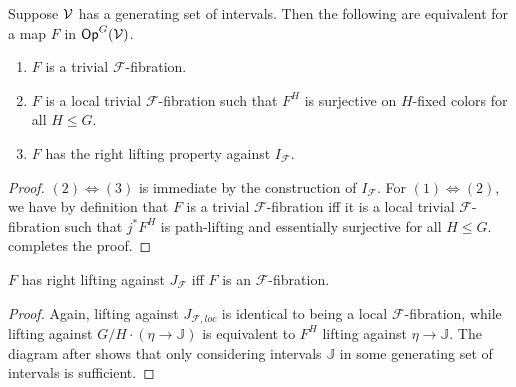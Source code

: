 \documentclass[a4paper,10pt
,draft
]{article}%
\renewcommand{\F}{\mathcal F}
\newcommand{\J}{\mathbb J}
\renewcommand{\1}{\eta}%
\begin{document}
\begin{lemma}
      \label{CAV_4.8}
      Suppose $\mathcal V$ has a generating set of intervals.
      Then the following are equivalent for a map $F$ in $\mathsf{Op}^G(\mathcal V)$.
      \begin{enumerate}[label = (\arabic*)]
      \item $F$ is a trivial $\F$-fibration.
      \item $F$ is a local trivial $\F$-fibration such that $F^H$ is surjective on $H$-fixed colors for all $H\leq G$.
      \item $F$ has the right lifting property against $I_{\F}$.
      \end{enumerate}
\end{lemma}
\begin{proof}
      $(2) \Leftrightarrow (3)$ is immediate by the construction of $I_{\F}$.
      For $(1) \Leftrightarrow (2)$, we have by definition that
      $F$ is a trivial $\F$-fibration
      iff
      it is a local trivial $\F$-fibration such that $j^*F^H$ is path-lifting and essentially surjective for all $H\leq G$.
      \cite[2.4]{BM13} completes the proof. 
\end{proof}

\begin{lemma}
      $F$ has right lifting against $J_{\F}$ iff $F$ is an $\F$-fibration.
\end{lemma}
\begin{proof}
      Again, lifting against $J_{\F, loc}$ is identical to being a local $\F$-fibration, while lifting against $G/H \cdot (\1 \to \J)$
      is equivalent to $F^H$ lifting against $\1 \to \J$.
      The diagram after \cite[(4.3.2)]{Cav} shows that only considering intervals $\J$ in some generating set of intervals is sufficient.
\end{proof}
\end{document}
